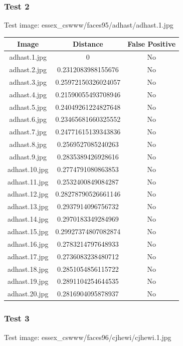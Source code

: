 \documentclass[12pt]{article}
\begin{document}
\newpage
\subsubsection{Test 2}
Test image: essex\_cswww/faces95/adhast/adhast.1.jpg

\begin{center}
\begin{tabular}{ccc}
Image & Distance & False Positive \\
\hline
adhast.1.jpg & 0 & No \\
adhast.2.jpg & 0.2312083988155676 & No \\
adhast.3.jpg & 0.25972150326024057 & No \\
adhast.4.jpg & 0.21590055493708946 & No \\
adhast.5.jpg & 0.24049261224827648 & No \\
adhast.6.jpg & 0.23465681660325552 & No \\
adhast.7.jpg & 0.24771615139343836 & No \\
adhast.8.jpg & 0.2569527085240263 & No \\
adhast.9.jpg & 0.2835389426928616 & No \\
adhast.10.jpg & 0.2774791080863853 & No \\
adhast.11.jpg & 0.2532400849084287 & No \\
adhast.12.jpg & 0.28278790526661146 & No \\
adhast.13.jpg & 0.2937914096756732 & No \\
adhast.14.jpg & 0.2970183349284969 & No \\
adhast.15.jpg & 0.29927374807082874 & No \\
adhast.16.jpg & 0.2783214797648933 & No \\
adhast.17.jpg & 0.2736083238480712 & No \\
adhast.18.jpg & 0.2851054856115722 & No \\
adhast.19.jpg & 0.2891104254644535 & No \\
adhast.20.jpg & 0.2816904095878937 & No \\
\end{tabular}
\end{center}

\newpage
\subsubsection{Test 3}
Test image: essex\_cswww/faces96/cjhewi/cjhewi.1.jpg
\end{document}
